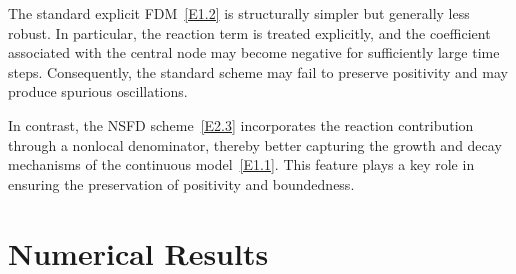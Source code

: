 \documentclass[final,12pt,3p]{elsarticle}
\theoremstyle{plain}
\theoremstyle{definition}
\theoremstyle{remark}
\begin{document}

The standard explicit FDM~\eqref{E1.2} is structurally simpler but generally less robust. 
In particular, the reaction term is treated explicitly, and the coefficient associated with the central node may become negative for sufficiently large time steps. 
Consequently, the standard scheme may fail to preserve positivity and may produce spurious oscillations.

In contrast, the NSFD scheme~\eqref{E2.3} incorporates the reaction contribution through a nonlocal denominator, thereby better capturing the growth and decay mechanisms of the continuous model~\eqref{E1.1}. 
This feature plays a key role in ensuring the preservation of positivity and boundedness.



\section{Numerical Results}\label{S4}
\end{document}
